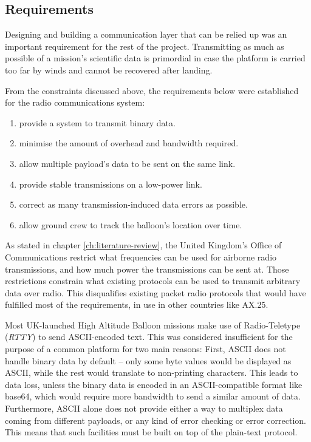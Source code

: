 \subsection{Requirements}
\label{ssec:requirements}

Designing and building a communication layer that can be relied up was an
important requirement for the rest of the project. Transmitting as much as
possible of a mission's scientific data is primordial in case the platform
is carried too far by winds and cannot be recovered after landing.

From the constraints discussed above, the requirements below were established
for the radio communications system:

\begin{enumerate}
\item provide a system to transmit binary data.
\item minimise the amount of overhead and bandwidth required.
\item allow multiple payload's data to be sent on the same link.
\item provide stable transmissions on a low-power link.
\item correct as many transmission-induced data errors as possible.
\item allow ground crew to track the balloon's location over time.
\end{enumerate}


As stated in chapter \ref{ch:literature-review}, the United Kingdom's Office
of Communications restrict what frequencies can be used for airborne
radio transmissions, and how much power the transmissions can be sent at.
Those restrictions constrain what existing protocols can be used to transmit
arbitrary data over radio. This disqualifies existing packet radio protocols
that would have fulfilled most of the requirements, in use in other countries
like AX.25.

Most UK-launched High Altitude Balloon missions make use of Radio-Teletype
(\textit{RTTY}) to send ASCII-encoded text. This was considered insufficient
for the purpose of a common platform for two main reasons: First, ASCII does
not handle binary data by default -- only some byte values would be displayed
as ASCII, while the rest would translate to non-printing characters. This leads
to data loss, unless the binary data is encoded in an ASCII-compatible format
like base64, which would require more bandwidth to send a similar amount of
data. Furthermore, ASCII alone does not provide either a way to multiplex data
coming from different payloads, or any kind of error checking or error
correction. This means that such facilities must be built on top of the
plain-text protocol.

